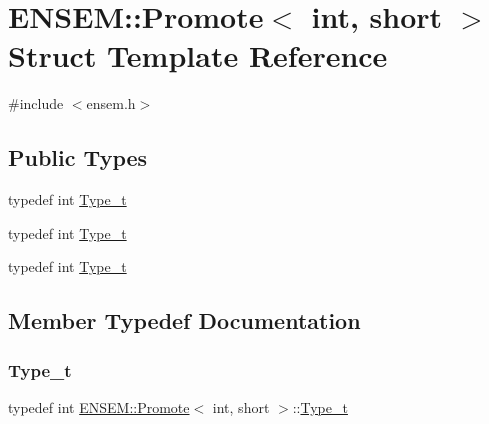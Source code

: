 \hypertarget{structENSEM_1_1Promote_3_01int_00_01short_01_4}{}\section{E\+N\+S\+EM\+:\+:Promote$<$ int, short $>$ Struct Template Reference}
\label{structENSEM_1_1Promote_3_01int_00_01short_01_4}


{\ttfamily \#include $<$ensem.\+h$>$}

\subsection*{Public Types}
\begin{DoxyCompactItemize}
\item 
typedef int \mbox{\hyperlink{structENSEM_1_1Promote_3_01int_00_01short_01_4_ad2e469fb4504abcc6e15dac9af8a8078}{Type\+\_\+t}}
\item 
typedef int \mbox{\hyperlink{structENSEM_1_1Promote_3_01int_00_01short_01_4_ad2e469fb4504abcc6e15dac9af8a8078}{Type\+\_\+t}}
\item 
typedef int \mbox{\hyperlink{structENSEM_1_1Promote_3_01int_00_01short_01_4_ad2e469fb4504abcc6e15dac9af8a8078}{Type\+\_\+t}}
\end{DoxyCompactItemize}


\subsection{Member Typedef Documentation}
\mbox{\label{structENSEM_1_1Promote_3_01int_00_01short_01_4_ad2e469fb4504abcc6e15dac9af8a8078}} 
\subsubsection{\texorpdfstring{Type\_t}{Type\_t}\hspace{0.1cm}{\footnotesize\ttfamily [1/3]}}
{\footnotesize\ttfamily typedef int \mbox{\hyperlink{structENSEM_1_1Promote}{E\+N\+S\+E\+M\+::\+Promote}}$<$ int, short $>$\+::\mbox{\hyperlink{structENSEM_1_1Promote_3_01int_00_01short_01_4_ad2e469fb4504abcc6e15dac9af8a8078}{Type\+\_\+t}}}

\mbox{\label{structENSEM_1_1Promote_3_01int_00_01short_01_4_ad2e469fb4504abcc6e15dac9af8a8078}} 

